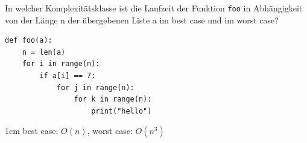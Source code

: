 \question[2]
In welcher Komplexitätsklasse ist die Laufzeit der
   Funktion \texttt{foo} in Abhängigkeit von der Länge
    n der übergebenen Liste a im best case und im worst case?
\begin{lstlisting}
def foo(a):
    n = len(a)
    for i in range(n):
        if a[i] == 7:
            for j in range(n):
                for k in range(n):
                    print("hello")
\end{lstlisting}

\begin{solutionbox}{1cm}
best case: $O(n)$, worst case: $O(n^3)$
\end{solutionbox}
